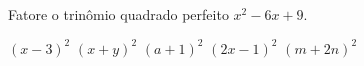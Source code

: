 Fatore o trinômio quadrado perfeito $x^2-6x+9$.

$(x-3)^2$
$(x+y)^2$
$(a+1)^2$
$(2x-1)^2$
$(m+2n)^2$


